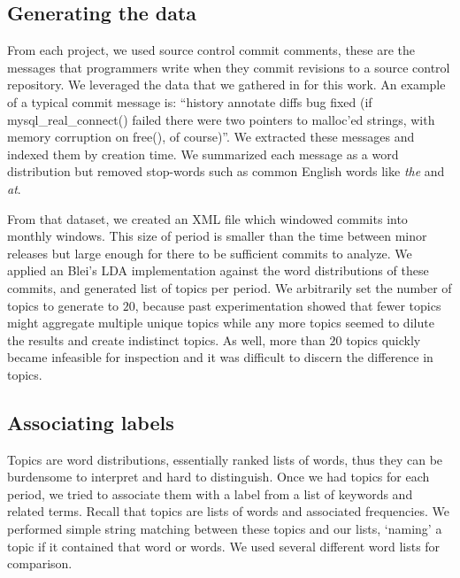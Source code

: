 \documentclass[10pt, conference, compsocconf]{IEEEtran}
\begin{document}
\subsection{Generating the data}
From each project, we used source control commit comments, these are the messages that programmers write when they commit revisions to a source control repository. We leveraged the data that we gathered in \cite{Hindle09ICSM} for this work. An example of a typical commit message is: ``history annotate diffs bug fixed (if mysql\_real\_connect() failed there were two pointers to malloc'ed strings, with memory corruption on free(), of course)''. We extracted these messages and indexed them by creation time. We summarized each message as a word distribution but removed stop-words such as   common English words like \emph{the} and \emph{at}.

From that dataset, we created an XML file which windowed commits into
monthly windows. This size of period is smaller than the time between minor releases but large enough for there to be sufficient commits to analyze. We applied an Blei's LDA implementation against the word distributions of these commits, and generated list of topics per period. 
We arbitrarily set the number of topics to generate to $20$, because past experimentation showed that fewer topics might aggregate multiple unique topics while any more topics seemed to dilute the results and create indistinct topics. As well, more than $20$ topics quickly became infeasible for inspection and it was difficult to discern the difference in topics.

\subsection{Associating labels}
\begin{comment}
\end{comment}

Topics are word distributions, essentially ranked lists of words, thus they can be burdensome to interpret and hard to distinguish.
Once we had topics for each period, we tried to associate them with a label from a list of keywords and related terms. Recall that topics are lists of words and associated frequencies. We performed simple string matching between these topics and our lists, `naming' a topic if it contained that word or words. We used several different word lists for comparison. 
\end{document}
